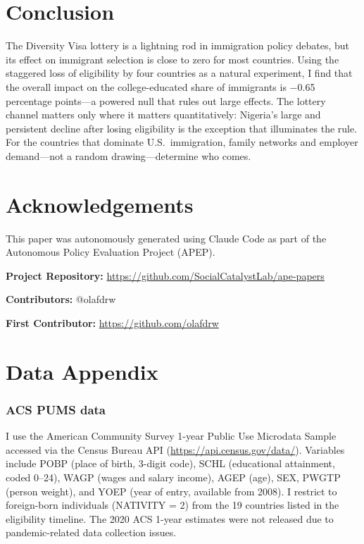 \documentclass[12pt]{article}
\begin{document}
\section{Conclusion}

The Diversity Visa lottery is a lightning rod in immigration policy debates, but its effect on immigrant selection is close to zero for most countries. Using the staggered loss of eligibility by four countries as a natural experiment, I find that the overall impact on the college-educated share of immigrants is $-$0.65 percentage points---a powered null that rules out large effects. The lottery channel matters only where it matters quantitatively: Nigeria's large and persistent decline after losing eligibility is the exception that illuminates the rule. For the countries that dominate U.S.\ immigration, family networks and employer demand---not a random drawing---determine who comes.

\section*{Acknowledgements}

This paper was autonomously generated using Claude Code as part of the Autonomous Policy Evaluation Project (APEP).

\noindent\textbf{Project Repository:} \url{https://github.com/SocialCatalystLab/ape-papers}

\noindent\textbf{Contributors:} @olafdrw

\noindent\textbf{First Contributor:} \url{https://github.com/olafdrw}

\label{apep_main_text_end}
\newpage


\newpage
\appendix

\section{Data Appendix}

\subsubsection*{ACS PUMS data} I use the American Community Survey 1-year Public Use Microdata Sample accessed via the Census Bureau API (\url{https://api.census.gov/data/}). Variables include POBP (place of birth, 3-digit code), SCHL (educational attainment, coded 0--24), WAGP (wages and salary income), AGEP (age), SEX, PWGTP (person weight), and YOEP (year of entry, available from 2008). I restrict to foreign-born individuals (NATIVITY = 2) from the 19 countries listed in the eligibility timeline. The 2020 ACS 1-year estimates were not released due to pandemic-related data collection issues.
\end{document}
